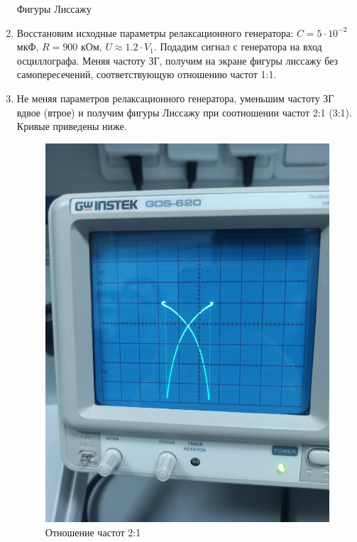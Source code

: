 \documentclass[a4paper, 12pt]{article}
\begin{document}
\begin{enumerate}
        \newpage

        \begin{center}
            Фигуры Лиссажу 
        \end{center}

        \item Восстановим исходные параметры релаксационного генератора: $C = 5 \cdot 10^{-2}$ мкФ, $R = 900$ кОм, $U \approx 1.2 \cdot V_1$. Подадим сигнал с генератора на вход осциллографа. Меняя частоту ЗГ, получим на экране фигуры лиссажу без самопересечений, соответствующую отношению частот 1:1.
        \item Не меняя параметров релаксационного генератора, уменьшим частоту ЗГ вдвое (втрое) и получим фигуры Лиссажу при соотношении частот 2:1 (3:1). Кривые приведены ниже.
        
        \begin{figure}[!h]
            \begin{center}
                \includegraphics[scale=0.3]{pic8.jpg}
                \caption{Отношение частот 2:1}
            \end{center}
        \end{figure}


\end{enumerate}
\end{document}
